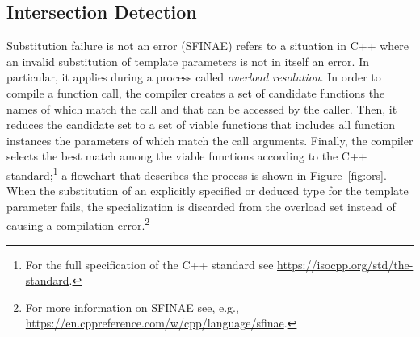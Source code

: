 \subsection{Intersection Detection}
\label{sec:code:intersectionDetection}
Substitution failure is not an error (SFINAE) refers to a situation in C++ where an invalid substitution of template parameters is not in itself an error. In particular, it applies during a process called \emph{overload resolution}.  In order to compile a function call, the compiler creates a set of candidate functions the names of which match the call and that can be accessed by the caller. Then, it reduces the candidate set to a set of viable functions that includes all function instances the parameters of which match the call arguments. Finally, the compiler selects the best match among the viable functions according to the C++ standard;\footnote{For the full specification of the C++ standard see \url{https://isocpp.org/std/the-standard}.} a flowchart that describes the process is shown in Figure~\ref{fig:ors}. When the substitution of an explicitly specified or deduced type for the template parameter fails, the specialization is discarded from the overload set instead of causing a compilation error.\footnote{For more information on SFINAE see, e.g., \url{https://en.cppreference.com/w/cpp/language/sfinae}.}

